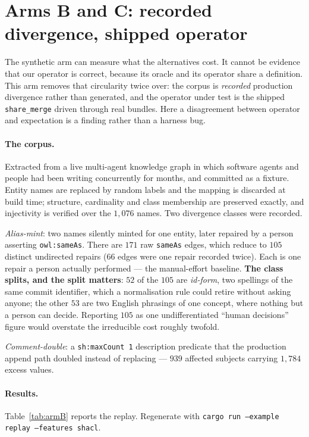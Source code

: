 \section{Arms B and C: recorded divergence, shipped operator}
\label{sec:replay}

The synthetic arm can measure what the alternatives cost. It cannot be evidence
that our operator is correct, because its oracle and its operator share a
definition. This arm removes that circularity twice over: the corpus is
\emph{recorded} production divergence rather than generated, and the operator
under test is the shipped \texttt{share\_merge} driven through real bundles.
Here a disagreement between operator and expectation is a finding rather than a
harness bug.

\paragraph{The corpus.} Extracted from a live multi-agent knowledge graph in
which software agents and people had been writing concurrently for months, and
committed as a fixture. Entity names are replaced by random labels and the
mapping is discarded at build time; structure, cardinality and class membership
are preserved exactly, and injectivity is verified over the $1{,}076$ names.
Two divergence classes were recorded.

\emph{Alias-mint}: two names silently minted for one entity, later repaired by a
person asserting \texttt{owl:sameAs}. There are $171$ raw \texttt{sameAs} edges,
which reduce to $105$ distinct undirected repairs ($66$ edges were one repair
recorded twice). Each is one repair a person actually performed --- the
manual-effort baseline. \textbf{The class splits, and the split matters}: $52$
of the $105$ are \emph{id-form}, two spellings of the same commit identifier,
which a normalisation rule could retire without asking anyone; the other $53$
are two English phrasings of one concept, where nothing but a person can decide.
Reporting $105$ as one undifferentiated ``human decisions'' figure would
overstate the irreducible cost roughly twofold.

\emph{Comment-double}: a \texttt{sh:maxCount 1} description predicate that the
production append path doubled instead of replacing --- $939$ affected subjects
carrying $1{,}784$ excess values.

\paragraph{Results.} Table~\ref{tab:armB} reports the replay. Regenerate with
\texttt{cargo run --example replay --features shacl}.

